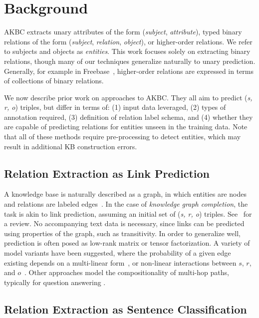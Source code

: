 \section{Background \label{sec:background}}

AKBC extracts unary attributes of the form (\textit{subject}, \textit{attribute}), typed binary relations of the form (\textit{subject}, \textit{relation}, \textit{object}), or higher-order relations. We refer to subjects and objects as \textit{entities}. This work focuses solely on extracting binary relations, though many of our techniques generalize naturally to unary prediction. Generally, for example in Freebase~\citep{freebase}, higher-order relations are expressed in terms of collections of binary relations.

We now describe prior work on approaches to AKBC. They all aim to predict (\emph{s, r, o}) triples, but differ in terms of: (1) input data leveraged, (2) types of annotation required, (3) definition of relation label schema, and (4) whether they are capable of predicting relations for entities unseen in the training data. Note that all of these methods require pre-processing to detect entities, which may result in additional KB construction errors.

\subsection{Relation Extraction as Link Prediction \label{sec:prediction}}
A knowledge base is naturally described as a graph, in which entities are nodes and relations are labeled edges~\citep{yago,freebase}. In the case of \emph{knowledge graph completion}, the task is akin to link prediction, assuming an initial set of (\emph{s, r, o}) triples. See~\citet{nickel2015review} for a review. No accompanying text data is necessary, since links can be predicted using properties of the graph, such as transitivity. In order to generalize well, prediction is often posed as low-rank matrix or tensor factorization. A variety of model variants have been suggested, where the probability of a given edge existing depends on a multi-linear form~\citep{rescal,DBLP:journals/corr/Garcia-DuranBUG15,bishan,transe,wang2014knowledge,lin2015learning}, or non-linear interactions between $s$, $r$, and $o$~\citep{socherkb}.
Other approaches model the compositionality of multi-hop paths, typically for question answering \citep{bordes2014question,gu2015traversing,neelakantan2015compositional}.

\subsection{Relation Extraction as Sentence Classification}
\label{seq:dist}

